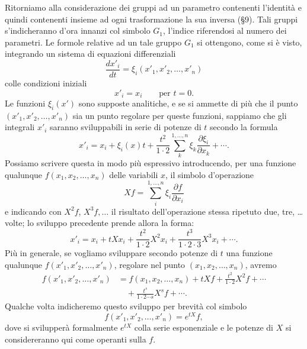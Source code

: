 \documentclass[11pt]{book}
\begin{document}
Ritorniamo alla considerazione dei gruppi ad un parametro contenenti l'identità e quindi contenenti insieme ad ogni trasformazione la sua inversa (\S{}9). Tali gruppi s'indicheranno d'ora innanzi col simbolo $G_1$, l'indice riferendosi al numero dei parametri. Le formole relative ad un tale gruppo $G_1$ si ottengono, come si è visto, integrando un sistema di equazioni differenziali
\[
 \frac{dx'_i}{dt}=\xi_i(x'_1,x'_2,\ldots,x'_n)
\]
colle condizioni iniziali
\[
 x'_i=x_i\qquad\text{per }t=0.
\]
Le funzioni $\xi_i(x')$ sono supposte analitiche, e se si ammette di più che il punto $(x'_1,x'_2,\ldots,x'_n)$ sia un punto regolare per queste funzioni, sappiamo che gli integrali $x'_i$ saranno sviluppabili in serie di potenze di $t$ secondo la formula
\[
 x'_i=x_i+\xi_i(x)t+\frac{t^2}{1\cdot2}\sum\limits_k^{1,\ldots,n} \xi_k\frac{\partial\xi_i}{\partial x_k}+\cdots .
\]
Possiamo scrivere questa in modo più espressivo introducendo, per una funzione qualunque $f(x_1,x_2,\ldots,x_n)$ delle variabili $x$, il simbolo d'operazione
\[
 Xf=\sum\limits_i^{1,\ldots,n}\xi_i\frac{\partial f}{\partial x_i}
\]
e indicando con $X^2f$, $X^3f,\ldots$ il risultato dell'operazione stessa ripetuto due, tre, \ldots volte; lo sviluppo precedente prende allora la forma:
\begin{equation*}\tag{17}
 x'_i=x_i+tXx_i+\frac{t^2}{1\cdot2}X^2x_i+\frac{t^3}{1\cdot2\cdot3}X^3x_i+\cdots .
\end{equation*}
Più in generale, se vogliamo sviluppare secondo potenze di $t$ una funzione qualunque $f(x'_1,x'_2,\ldots,x'_n)$, regolare nel punto $(x_1,x_2,\ldots,x_n)$, avremo
\begin{equation*}\tag{18}
\begin{aligned}
 f(x'_1,x'_2,\ldots,x'_n)&=f(x_1,x_2,\ldots,x_n)+tXf+\frac{t^2}{1\cdot2}X^2f+\cdots\\
 &\quad+\frac{t^s}{1\cdot2\cdots s}X^sf+\cdots .
\end{aligned}
\end{equation*}
Qualche volta indicheremo questo sviluppo per brevità col simbolo
\[
 f(x'_1,x'_2,\ldots,x'_n)=e^{tX}f,
\]
dove si svilupperà formalmente $e^{tX}$ colla serie esponenziale e le potenze di $X$ si considereranno qui come operanti sulla $f$.
\end{document}
